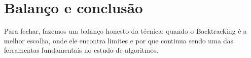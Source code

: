 \part{Balanço e conclusão}

Para fechar, fazemos um balanço honesto da técnica: quando o Backtracking é a melhor escolha, onde ele encontra limites e por que continua sendo uma das ferramentas fundamentais no estudo de algoritmos.
